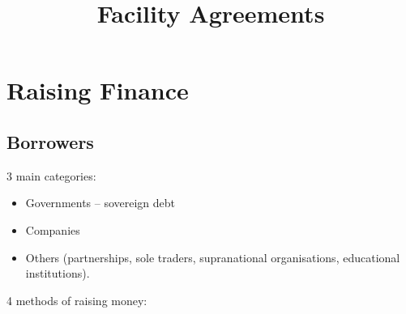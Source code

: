 \documentclass[
]{article}
\title{Facility Agreements}
\author{}
\date{}
\providecommand{\tightlist}{%
  \setlength{\itemsep}{0pt}\setlength{\parskip}{0pt}}
\begin{document}
\maketitle

{
\setcounter{tocdepth}{3}
\tableofcontents
}
\hypertarget{raising-finance}{%
\section{Raising Finance}\label{raising-finance}}

\hypertarget{borrowers}{%
\subsection{Borrowers}\label{borrowers}}

3 main categories:

\begin{itemize}
\tightlist
\item
  Governments -- sovereign debt
\item
  Companies
\item
  Others (partnerships, sole traders, supranational organisations,
  educational institutions).
\end{itemize}

4 methods of raising money:
\end{document}
